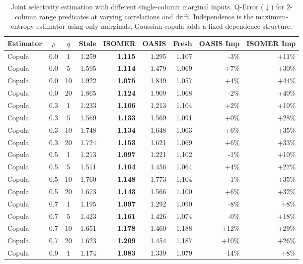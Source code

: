 \begin{table}[t]
  \centering
  \small
  \caption{Joint selectivity estimation with different single-column marginal inputs. Q-Error ($\downarrow$) for 2-column range predicates at varying correlations and drift. Independence is the maximum-entropy estimator using only marginals; Gaussian copula adds a fixed dependence structure.}
  \label{tab:copula}
  \setlength{\tabcolsep}{3pt}
  \begin{tabular}{lcc | rrrr | rr}
    \toprule
    Estimator & $\rho$ & $q$ & Stale & ISOMER & OASIS & Fresh & OASIS Imp & ISOMER Imp \\
    \midrule
    Copula & 0.0 & 1 & 1.259 & \textbf{1.115} & 1.295 & 1.107 & -3\% & +11\% \\
    Copula & 0.0 & 5 & 1.595 & \textbf{1.114} & 1.479 & 1.069 & +7\% & +30\% \\
    Copula & 0.0 & 10 & 1.922 & \textbf{1.075} & 1.849 & 1.057 & +4\% & +44\% \\
    Copula & 0.0 & 20 & 1.865 & \textbf{1.124} & 1.909 & 1.068 & -2\% & +40\% \\
    Copula & 0.3 & 1 & 1.233 & \textbf{1.106} & 1.213 & 1.104 & +2\% & +10\% \\
    Copula & 0.3 & 5 & 1.569 & \textbf{1.133} & 1.569 & 1.091 & +0\% & +28\% \\
    Copula & 0.3 & 10 & 1.748 & \textbf{1.134} & 1.648 & 1.063 & +6\% & +35\% \\
    Copula & 0.3 & 20 & 1.724 & \textbf{1.153} & 1.621 & 1.069 & +6\% & +33\% \\
    Copula & 0.5 & 1 & 1.213 & \textbf{1.097} & 1.221 & 1.102 & -1\% & +10\% \\
    Copula & 0.5 & 5 & 1.511 & \textbf{1.104} & 1.456 & 1.064 & +4\% & +27\% \\
    Copula & 0.5 & 10 & 1.760 & \textbf{1.148} & 1.773 & 1.104 & -1\% & +35\% \\
    Copula & 0.5 & 20 & 1.673 & \textbf{1.143} & 1.566 & 1.100 & +6\% & +32\% \\
    Copula & 0.7 & 1 & 1.195 & \textbf{1.097} & 1.292 & 1.090 & -8\% & +8\% \\
    Copula & 0.7 & 5 & 1.423 & \textbf{1.161} & 1.426 & 1.074 & -0\% & +18\% \\
    Copula & 0.7 & 10 & 1.651 & \textbf{1.178} & 1.460 & 1.188 & +12\% & +29\% \\
    Copula & 0.7 & 20 & 1.623 & \textbf{1.209} & 1.454 & 1.187 & +10\% & +26\% \\
    Copula & 0.9 & 1 & 1.174 & \textbf{1.083} & 1.339 & 1.079 & -14\% & +8\% \\

\end{tabular}
\end{table}

